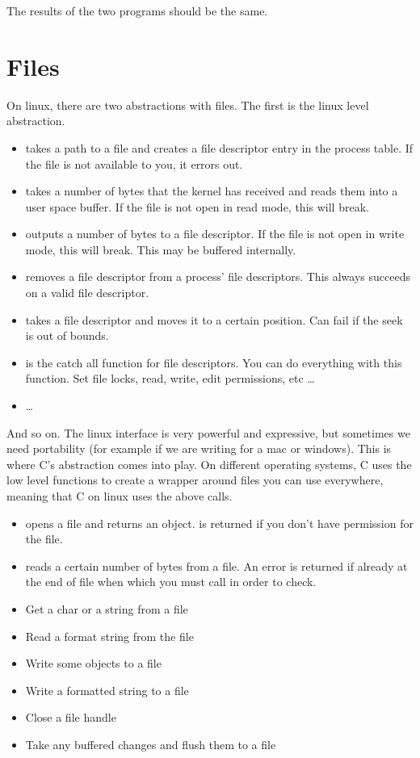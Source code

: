 The results of the two programs should be the same.



\section{Files}

On linux, there are two abstractions with files. The first is the linux  level abstraction.

 \begin{itemize}
\item {} takes a path to a file and creates a file descriptor entry in the process table. If the file is not available to you, it errors out.
\item {} takes a number of bytes that the kernel has received and reads them into a user space buffer. If the file is not open in read mode, this will break.
\item {} outputs a number of bytes to a file descriptor. If the file is not open in write mode, this will break. This may be buffered internally.
\item {} removes a file descriptor from a process' file descriptors. This always succeeds on a valid file descriptor.
\item {} takes a file descriptor and moves it to a certain position. Can fail if the seek is out of bounds.
\item {} is the catch all function for file descriptors. You can do everything with this function. Set file locks, read, write, edit permissions, etc \ldots{}
\item \ldots{}
 \end{itemize}

And so on. The linux interface is very powerful and expressive, but sometimes we need portability (for example if we are writing for a mac or windows). This is where C's abstraction comes into play. On different operating systems, C uses the low level functions to create a wrapper around files you can use everywhere, meaning that C on linux uses the above calls.

\begin{itemize}
\item {} opens a file and returns an object.  is returned if you don't have permission for the file.
\item {} reads a certain number of bytes from a file. An error is returned if already at the end of file when which you must call  in order to check.
\item {} Get a char or a string from a file
\item {} Read a format string from the file
\item {} Write some objects to a file
\item {} Write a formatted string to a file
\item {} Close a file handle
\item {} Take any buffered changes and flush them to a file
\end{itemize}

